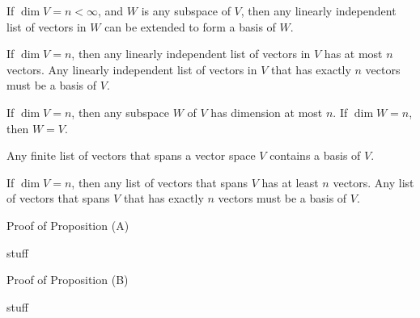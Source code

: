 \endedxproblem


\endedxvertical










{}  If $\dim V = n < \infty$, and $W$ is any subspace of $V$, then any
linearly independent list of vectors in $W$ can be extended to form a basis of $W$.  

{} If $\dim V = n$, then any linearly independent list of vectors in $V$ has
at most $n$ vectors.  Any linearly independent list of vectors in $V$ that has exactly $n$ vectors must
be a basis of $V$.  


{} If $\dim V = n$, then any subspace $W$ of $V$ has dimension at most $n$.  
If $\dim W = n$, then $W = V$.  


{} Any finite list of vectors that spans a vector space $V$ contains a basis of $V$.  

{} If $\dim V = n$, then any list of vectors that spans $V$ has
at least $n$ vectors.  Any  list of vectors that spans $V$ that has exactly $n$ vectors must
be a basis of $V$.  


\begin{edXshowhide}{Proof of Proposition (A)}

stuff

\end{edXshowhide}


\begin{edXshowhide}{Proof of Proposition (B)}

stuff

\end{edXshowhide}



\endedxtext

\endedxvertical
